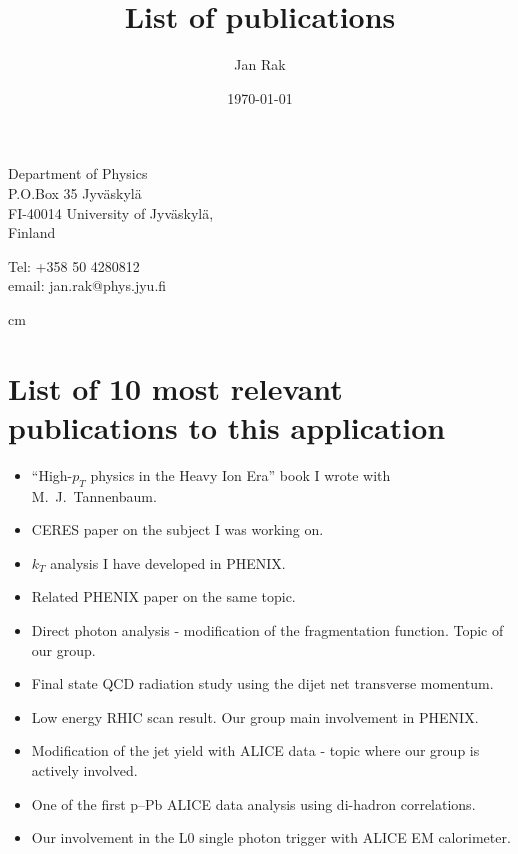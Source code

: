 \documentclass[12pt]{article}
\title{List of publications}
\date{\today}
\author{Jan Rak}
\begin{document}
\maketitle

\parbox{7cm}{
Department of Physics\\
P.O.Box 35 Jyv\"askyl\"a\\
FI-40014 University of Jyv\"askyl\"a,\\ 
Finland}
\hfill
\parbox{5cm}{
Tel: +358 50 4280812\\
email: jan.rak@phys.jyu.fi\\
}

 cm

\section{List of 10 most relevant publications to this application}
\begin{itemize}
\item \cite{JanRak2013} ``High-$p_{T}$ physics in the Heavy Ion Era'' book I wrote with M.~J.~Tannenbaum.
\item \cite{Agakichiev:2003gg} CERES paper on the subject I was working on.
\item \cite{Adler:2006sc} $k_{T}$ analysis I have developed in PHENIX.
\item \cite{Adler:2005ad} Related PHENIX paper on the same topic. %
\item \cite{Adare:2010yw} Direct photon analysis - modification of the fragmentation function. Topic of our group. %
\item \cite{Adam:2015xea} Final state QCD radiation study using the dijet net transverse momentum.
\item \cite{Adare:2012uk}  Low energy RHIC scan result. Our group main involvement in PHENIX. %
\item \cite{Aamodt:2011vg} Modification of the jet yield with ALICE data - topic where our group is actively involved. %
\item \cite{Abelev:2012ola} One of the first p--Pb ALICE data analysis using di-hadron correlations. %
\item \cite{Kral:2012ae} Our involvement in the L0 single photon trigger with ALICE EM calorimeter.
\end{itemize}
\end{document}
